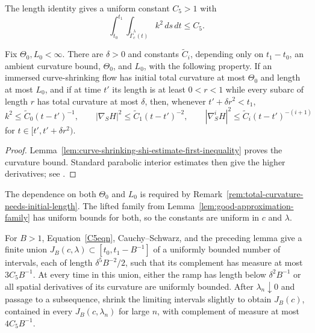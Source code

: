 The length identity gives a uniform constant $C_5>1$ with
\begin{equation}\label{C5eqn}
\int_{t_0}^{t_1}\int_{\widetilde\Gamma_c^\lambda(t)}k^2\,ds\,dt\le C_5.
\end{equation}

\begin{lemma}
\label{lem:curve-shrinking-shi-estimate}
\label{CSSHI}


Fix $\Theta_0,L_0<\infty$. There are $\delta>0$ and constants
$\widetilde C_i$, depending only on $t_1-t_0$, an ambient curvature bound,
$\Theta_0$, and $L_0$, with the following property. If an immersed
curve-shrinking flow has initial total curvature at most $\Theta_0$ and length
at most $L_0$, and if at time $t'$ its length is at least $0<r<1$ while every
subarc of length $r$ has total curvature at most $\delta$, then, whenever
$t'+\delta r^2<t_1$,
\[
k^2\le\widetilde C_0(t-t')^{-1},\qquad
|\nabla_SH|^2\le\widetilde C_1(t-t')^{-2},\qquad
|\nabla_S^iH|^2\le\widetilde C_i(t-t')^{-(i+1)}
\]
for $t\in[t',t'+\delta r^2)$.
\end{lemma}
\begin{proof}
\sketch Lemma~\ref{lem:curve-shrinking-shi-estimate-first-inequality} proves
the curvature bound. Standard parabolic interior estimates then give the
higher derivatives; see \cite{AG,Altschuler}.
\end{proof}

\begin{remark}
\label{rem:shi-constants-depend-on-initial-data}


The dependence on both $\Theta_0$ and $L_0$ is required by
Remark~\ref{rem:total-curvature-needs-initial-length}. The lifted family from
Lemma~\ref{lem:good-approximation-family} has uniform bounds for both, so the
constants are uniform in $c$ and $\lambda$.
\end{remark}

For $B>1$, Equation~\eqref{C5eqn}, Cauchy--Schwarz, and the preceding lemma
give a finite union $J_B(c,\lambda)\subset[t_0,t_1-B^{-1}]$ of a uniformly
bounded number of intervals, each of length $\delta^5B^{-2}/2$, such that its
complement has measure at most $3C_5B^{-1}$. At every time in this union,
either the ramp has length below $\delta^2B^{-1}$ or all spatial derivatives
of its curvature are uniformly bounded. After $\lambda_n\downarrow0$ and
passage to a subsequence, shrink the limiting intervals slightly to obtain
$J_B(c)$, contained in every $J_B(c,\lambda_n)$ for large $n$, with complement
of measure at most $4C_5B^{-1}$.

